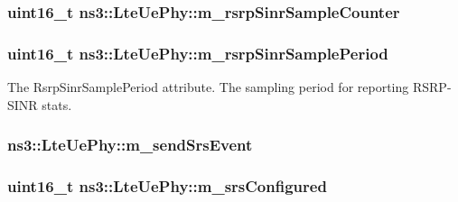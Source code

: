 \subsubsection[{\texorpdfstring{m\+\_\+rsrp\+Sinr\+Sample\+Counter}{m_rsrpSinrSampleCounter}}]{\setlength{\rightskip}{0pt plus 5cm}uint16\+\_\+t ns3\+::\+Lte\+Ue\+Phy\+::m\+\_\+rsrp\+Sinr\+Sample\+Counter\hspace{0.3cm}{\ttfamily [private]}}\hypertarget{classns3_1_1LteUePhy_a1b0a01c9da8427095d325cc12b0cdccb}{}\label{classns3_1_1LteUePhy_a1b0a01c9da8427095d325cc12b0cdccb}
\subsubsection[{\texorpdfstring{m\+\_\+rsrp\+Sinr\+Sample\+Period}{m_rsrpSinrSamplePeriod}}]{\setlength{\rightskip}{0pt plus 5cm}uint16\+\_\+t ns3\+::\+Lte\+Ue\+Phy\+::m\+\_\+rsrp\+Sinr\+Sample\+Period\hspace{0.3cm}{\ttfamily [private]}}\hypertarget{classns3_1_1LteUePhy_a850c3c3e0a9f23f2907a2a6647a23f84}{}\label{classns3_1_1LteUePhy_a850c3c3e0a9f23f2907a2a6647a23f84}
The {\ttfamily Rsrp\+Sinr\+Sample\+Period} attribute. The sampling period for reporting R\+S\+R\+P-\/\+S\+I\+NR stats. 
\subsubsection[{\texorpdfstring{m\+\_\+send\+Srs\+Event}{m_sendSrsEvent}}]{ ns3\+::\+Lte\+Ue\+Phy\+::m\+\_\+send\+Srs\+Event\hspace{0.3cm}{\ttfamily [private]}}\hypertarget{classns3_1_1LteUePhy_aa5d34457c03a8a5d276546f800b41ab6}{}\label{classns3_1_1LteUePhy_aa5d34457c03a8a5d276546f800b41ab6}
\subsubsection[{\texorpdfstring{m\+\_\+srs\+Configured}{m_srsConfigured}}]{\setlength{\rightskip}{0pt plus 5cm}uint16\+\_\+t ns3\+::\+Lte\+Ue\+Phy\+::m\+\_\+srs\+Configured\hspace{0.3cm}{\ttfamily [private]}}\hypertarget{classns3_1_1LteUePhy_a7dfdd1f166251b84e6c09f3a3544b37d}{}\label{classns3_1_1LteUePhy_a7dfdd1f166251b84e6c09f3a3544b37d}
